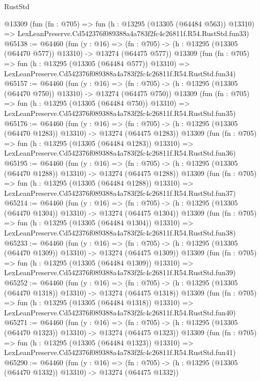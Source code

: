 \begin{lexlean}{RustStd}
\begin{coremodule}
    @13309
    (fun (fn : @705) =>
    fun (h : @13295 (@13305 (@64484 @563)) @13310) =>
    LexLeanPreserve.Cd542376f089388a4a783f2fc4c26811f.R54.RustStd.fun33)
@65138 := @64460
    (fun (y : @16) =>
    (fn : @705) -> (h : @13295 (@13305 (@64470 @577)) @13310) -> @13274 (@64475 @577))
    @13309
    (fun (fn : @705) =>
    fun (h : @13295 (@13305 (@64484 @577)) @13310) =>
    LexLeanPreserve.Cd542376f089388a4a783f2fc4c26811f.R54.RustStd.fun34)
@65157 := @64460
    (fun (y : @16) =>
    (fn : @705) -> (h : @13295 (@13305 (@64470 @750)) @13310) -> @13274 (@64475 @750))
    @13309
    (fun (fn : @705) =>
    fun (h : @13295 (@13305 (@64484 @750)) @13310) =>
    LexLeanPreserve.Cd542376f089388a4a783f2fc4c26811f.R54.RustStd.fun35)
@65176 := @64460
    (fun (y : @16) =>
    (fn : @705) -> (h : @13295 (@13305 (@64470 @1283)) @13310) -> @13274 (@64475 @1283))
    @13309
    (fun (fn : @705) =>
    fun (h : @13295 (@13305 (@64484 @1283)) @13310) =>
    LexLeanPreserve.Cd542376f089388a4a783f2fc4c26811f.R54.RustStd.fun36)
@65195 := @64460
    (fun (y : @16) =>
    (fn : @705) -> (h : @13295 (@13305 (@64470 @1288)) @13310) -> @13274 (@64475 @1288))
    @13309
    (fun (fn : @705) =>
    fun (h : @13295 (@13305 (@64484 @1288)) @13310) =>
    LexLeanPreserve.Cd542376f089388a4a783f2fc4c26811f.R54.RustStd.fun37)
@65214 := @64460
    (fun (y : @16) =>
    (fn : @705) -> (h : @13295 (@13305 (@64470 @1304)) @13310) -> @13274 (@64475 @1304))
    @13309
    (fun (fn : @705) =>
    fun (h : @13295 (@13305 (@64484 @1304)) @13310) =>
    LexLeanPreserve.Cd542376f089388a4a783f2fc4c26811f.R54.RustStd.fun38)
@65233 := @64460
    (fun (y : @16) =>
    (fn : @705) -> (h : @13295 (@13305 (@64470 @1309)) @13310) -> @13274 (@64475 @1309))
    @13309
    (fun (fn : @705) =>
    fun (h : @13295 (@13305 (@64484 @1309)) @13310) =>
    LexLeanPreserve.Cd542376f089388a4a783f2fc4c26811f.R54.RustStd.fun39)
@65252 := @64460
    (fun (y : @16) =>
    (fn : @705) -> (h : @13295 (@13305 (@64470 @1318)) @13310) -> @13274 (@64475 @1318))
    @13309
    (fun (fn : @705) =>
    fun (h : @13295 (@13305 (@64484 @1318)) @13310) =>
    LexLeanPreserve.Cd542376f089388a4a783f2fc4c26811f.R54.RustStd.fun40)
@65271 := @64460
    (fun (y : @16) =>
    (fn : @705) -> (h : @13295 (@13305 (@64470 @1323)) @13310) -> @13274 (@64475 @1323))
    @13309
    (fun (fn : @705) =>
    fun (h : @13295 (@13305 (@64484 @1323)) @13310) =>
    LexLeanPreserve.Cd542376f089388a4a783f2fc4c26811f.R54.RustStd.fun41)
@65290 := @64460
    (fun (y : @16) =>
    (fn : @705) -> (h : @13295 (@13305 (@64470 @1332)) @13310) -> @13274 (@64475 @1332))

\end{coremodule}
\end{lexlean}
